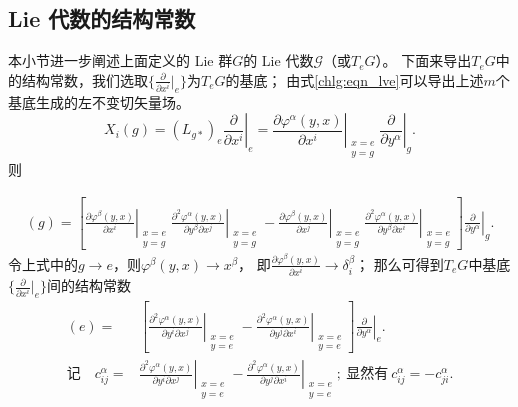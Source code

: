 \subsection{Lie 代数的结构常数}
本小节进一步阐述上面定义的 Lie 群$G$的 Lie 代数$\mathscr{G}$（或$T_eG$）。
下面来导出$T_eG$中的结构常数，我们选取$\{\frac{\partial}{\partial x^i}|_{e}\}$为$T_eG$的基底；
由式\eqref{chlg:eqn_lve}可以导出上述$m$个基底生成的左不变切矢量场。
\begin{equation}
    X_i(g)=(L_{g*})_e \left.\frac{\partial }{\partial x^i}\right|_e
    = \left. \frac{\partial \varphi^\alpha (y,x)}{\partial x^i}
    \right|_{\substack{x=e\\y=g}}  \left. \frac{\partial}{\partial y^\alpha}\right|_{g} .
\end{equation}
则

\begin{align*}
    [X_i, X_j](g)= \left[ \left. \frac{\partial \varphi^\beta (y,x)}{\partial x^i} \right| _{\substack{x=e\\y=g}}
    \left. \frac{\partial^2 \varphi^\alpha (y,x)}{\partial y^\beta \partial x^j} \right|_{\substack{x=e\\y=g}}
    -\left. \frac{\partial \varphi^\beta (y,x)}{\partial x^j} \right| _{\substack{x=e\\y=g}}
    \left. \frac{\partial^2 \varphi^\alpha (y,x)}{\partial y^\beta \partial x^i} \right|_{\substack{x=e\\y=g}}
    \right] \left. \frac{\partial}{\partial y^\alpha}\right|_{g} .
\end{align*}
令上式中的$g\to e$，则$\varphi^\beta(y,x) \to x^\beta$，
即$\frac{\partial \varphi^\beta (y,x)}{\partial x^i}\to \delta^\beta_i$；
那么可得到$T_eG$中基底$\{\frac{\partial}{\partial x^i}|_{e}\}$间的结构常数
\begin{align}
    [X_i, X_j](e)=& \left[ \left. \frac{\partial^2 \varphi^\alpha (y,x)}{\partial y^i \partial x^j} \right|_{\substack{x=e\\y=e}}
    -\left. \frac{\partial^2 \varphi^\alpha (y,x)}{\partial y^j \partial x^i} \right|_{\substack{x=e\\y=e}}
    \right] \left. \frac{\partial}{\partial y^\alpha}\right|_{e} . \\
    \text{记}\quad
    c^\alpha_{ij}=&\left. \frac{\partial^2 \varphi^\alpha (y,x)}{\partial y^i \partial x^j} \right|_{\substack{x=e\\y=e}} -\left.
    \frac{\partial^2 \varphi^\alpha (y,x)}{\partial y^j \partial x^i} \right|_{\substack{x=e\\y=e}};
    \ \text{显然有}\  c^\alpha_{ij} = -c^\alpha_{ji} .\label{chlg:eqn_struc-const}
\end{align}

